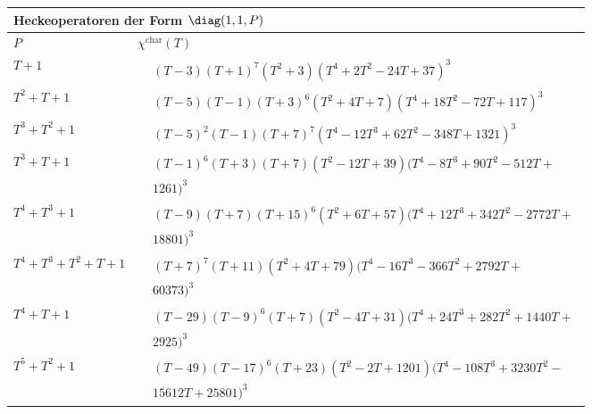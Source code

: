 \begin{tabular}{| l | l |}
\multicolumn{2}{l}{\bf Heckeoperatoren der Form $\diag(1,1,P)$} \\
\hline
$P$ & $\chi^\text{char}(T)$ \\
\hline
$T + 1$ &
$\!\begin{aligned}
	&(T - 3)(T + 1)^{7}(T^{2} + 3)(T^{4} + 2T^{2} - 24T + 37)^{3}\end{aligned}$ \\
\hline
$T^2 + T + 1$ &
$\!\begin{aligned}
	&(T - 5)(T - 1)(T + 3)^{6}(T^{2} + 4T + 7)(T^{4} + 18T^{2} - 72T + 117)^{3}\end{aligned}$ \\
\hline
$T^3 + T^2 + 1$ &
$\!\begin{aligned}
	&(T - 5)^{2}(T - 1)(T + 7)^{7}(T^{4} - 12T^{3} + 62T^{2} - 348T + 1321)^{3}\end{aligned}$ \\
\hline
$T^3 + T + 1$ &
$\!\begin{aligned}
	&(T - 1)^{6}(T + 3)(T + 7)(T^{2} - 12T + 39)(T^{4} - 8T^{3} + 90T^{2} - 512T + \\&
1261)^{3}\end{aligned}$ \\
\hline
$T^4 + T^3 + 1$ &
$\!\begin{aligned}
	&(T - 9)(T + 7)(T + 15)^{6}(T^{2} + 6T + 57)(T^{4} + 12T^{3} + 342T^{2} - 2772T +\\&
18801)^{3}\end{aligned}$ \\
\hline
$T^4 + T^3 + T^2 + T + 1$ &
$\!\begin{aligned}
	&(T + 7)^{7}(T + 11)(T^{2} + 4T + 79)(T^{4} - 16T^{3} - 366T^{2} + 2792T + \\&
60373)^{3}\end{aligned}$ \\
\hline
$T^4 + T + 1$ &
$\!\begin{aligned}
	&(T - 29)(T - 9)^{6}(T + 7)(T^{2} - 4T + 31)(T^{4} + 24T^{3} + 282T^{2} + 1440T +\\&
2925)^{3}\end{aligned}$ \\
\hline
$T^5 + T^2 + 1$ &
$\!\begin{aligned}
	&(T - 49)(T - 17)^{6}(T + 23)(T^{2} - 2T + 1201)(T^{4} - 108T^{3} + 3230T^{2} - \\&
15612T + 25801)^{3}\end{aligned}$ \\
\hline
\end{tabular}


